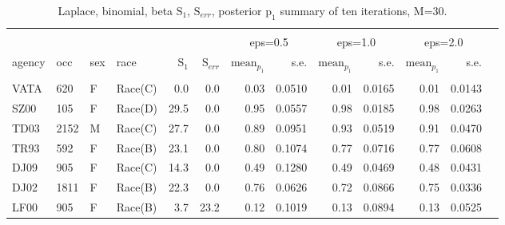 \documentclass[10pt, letterpaper]{article}
\begin{document}
\begin{spacing}{1.0}
\begin{table}[h!]
    \centering
    \caption{Laplace, binomial, beta $\text{S}_1$, $\text{S}_{err}$, posterior $\text{p}_1$ summary of ten iterations, M=30.}
    \label{table:lbb-M30}
    \begin{tabular}{llllrrrrrrrrr}
        \hline\\[-10pt]
        & & & & & & \multicolumn{2}{c}{eps=0.5} & \multicolumn{2}{c}{eps=1.0} & \multicolumn{2}{c}{eps=2.0} \\
        agency & occ & sex & race & $\text{S}_1$ & $\text{S}_{err}$ & $\text{mean}_{p_1}$ & s.e. & $\text{mean}_{p_1}$ & s.e. & $\text{mean}_{p_1}$ & s.e. \\  
        \hline\\[-6pt]
        VATA & 620 & F & Race(C) & 0.0 & 0.0 & 0.03 & 0.0510 & 0.01 & 0.0165 & 0.01 & 0.0143 \\ 
        SZ00 & 105 & F & Race(D) & 29.5 & 0.0 & 0.95 & 0.0557 & 0.98 & 0.0185 & 0.98 & 0.0263 \\ 
        TD03 & 2152 & M & Race(C) & 27.7 & 0.0 & 0.89 & 0.0951 & 0.93 & 0.0519 & 0.91 & 0.0470 \\ 
        TR93 & 592 & F & Race(B) & 23.1 & 0.0 & 0.80 & 0.1074 & 0.77 & 0.0716 & 0.77 & 0.0608 \\ 
        DJ09 & 905 & F & Race(C) & 14.3 & 0.0 & 0.49 & 0.1280 & 0.49 & 0.0469 & 0.48 & 0.0431 \\ 
        DJ02 & 1811 & F & Race(B) & 22.3 & 0.0 & 0.76 & 0.0626 & 0.72 & 0.0866 & 0.75 & 0.0336 \\ 
        LF00 & 905 & F & Race(B) & 3.7 & 23.2 & 0.12 & 0.1019 & 0.13 & 0.0894 & 0.13 & 0.0525 \\ 
        \hline
    \end{tabular}
\end{table}


\end{spacing}
\end{document}
